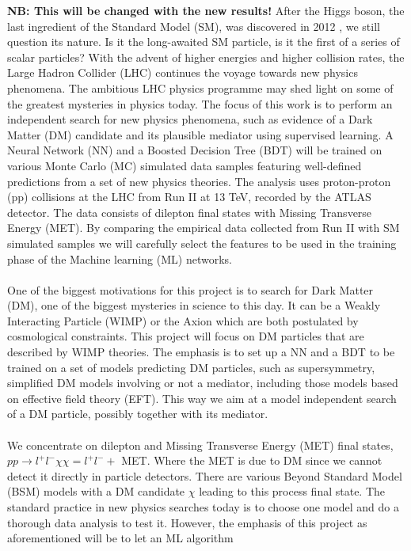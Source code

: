 \documentclass[12pt, a4paper]{book}
\begin{document}
\textbf{NB: This will be changed with the new results!}
After the Higgs boson, the last ingredient of the Standard Model (SM), was discovered in 2012 \cite{Higgs_discovery_2012}, we still question its nature. Is it the long-awaited SM particle, is it the first of a series of scalar particles? 
With the advent of higher energies and higher collision rates, the Large Hadron Collider (LHC) continues the voyage towards new physics phenomena. The ambitious LHC physics programme may shed light on some of the greatest mysteries in physics today. 
The focus of this work is to perform an independent search for new physics phenomena, such as evidence of a Dark Matter (DM) candidate and its plausible mediator using supervised learning. A Neural Network (NN) and a Boosted Decision Tree (BDT) will 
be trained on various Monte Carlo (MC) simulated data samples featuring well-defined predictions from a set of new physics theories. The analysis uses proton-proton (pp) collisions at the LHC from Run II at 13 TeV, recorded by the ATLAS detector. 
The data consists of dilepton final states with Missing Transverse Energy (MET). By comparing the empirical data collected from Run II with SM simulated samples we will carefully select the features to be used in the training phase of the Machine learning 
(ML) networks. \\
\\ One of the biggest motivations for this project is to search for Dark Matter (DM), one of the biggest mysteries in science to this day. It can be a Weakly Interacting Particle (WIMP) \cite{WIMP} or the Axion \cite{Axion} which are both postulated by cosmological constraints. 
This project will focus on DM particles that are described by WIMP theories. The emphasis is to set up a NN and a BDT to be trained on a set of models predicting DM particles, such as supersymmetry, simplified DM models involving or not a mediator, including those 
models based on effective field theory (EFT). This way we aim at a model independent search of a DM particle, possibly together with its mediator.\\
\\ We concentrate on dilepton and Missing Transverse Energy (MET) final states, $pp\rightarrow l^+l^- \chi\chi = l^+l^-+$ MET. Where the MET is due to DM since we cannot detect it directly in particle detectors. There are various Beyond Standard Model (BSM) models 
with a DM candidate $\chi$ leading to this process final state. The standard practice in new physics searches today is to choose one model and do a thorough data analysis to test it. However, the emphasis of this project as aforementioned will be to let an ML algorithm 
\end{document}
